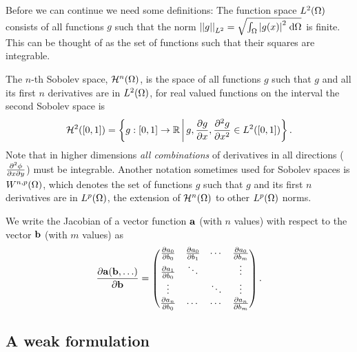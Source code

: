 Before we can continue we need some definitions:
The function space $L^{2}(\Omega)$ consists of all functions $g$ such that the norm $\left| \left| g \right| \right|_{L^2} = \sqrt{{\int_{\Omega} {\left|{g(x)} \right|^{2}} {\; \mathrm{{d}}} {\Omega}}}$ is finite.
This can be thought of as the set of functions such that their squares are integrable.

The $n$-th Sobolev space, $\mathcal{H}^n(\Omega)$, is the space of all functions $g$ such that $g$ and all its first $n$ derivatives are in $L^2(\Omega)$, \eg for real valued functions on the interval the second Sobolev space is
\begin{equation}
  \label{eq:H1}
  \mathcal{H}^2([0,1]) = \left\{ { g : [0,1] \rightarrow \mathbb{R} } \,\middle|\, { g, \frac{\partial g}{\partial x}, \frac{\partial ^2g}{\partial x^2} \in L^2([0,1])} \right\}.
\end{equation}
Note that in higher dimensions \emph{all combinations} of derivatives in all directions (\eg $\frac{\partial ^2\phi}{\partial x\partial y}$) must be integrable.
Another notation sometimes used for Sobolev spaces is $W^{n,p}(\Omega)$, which denotes the set of functions $g$ such that $g$ and its first $n$ derivatives are in $L^p(\Omega)$, \ie the extension of $\mathcal{H}^n(\Omega)$ to other $L^p(\Omega)$ norms.

We write the Jacobian of a vector function ${\boldsymbol{\mathrm{a}}}$ (with $n$ values) with respect to the vector ${\boldsymbol{\mathrm{b}}}$ (with $m$ values) as
\begin{equation}
  \frac{\partial {\boldsymbol{\mathrm{a}}}({\boldsymbol{\mathrm{b}}}, \ldots)}{\partial {\boldsymbol{\mathrm{b}}}} = \begin{pmatrix}
    \frac{\partial a_0}{\partial b_0} & \frac{\partial a_0}{\partial b_1} & \cdots & \frac{\partial a_0}{\partial b_m} \\
    \frac{\partial a_1}{\partial b_0} & \ddots & & \vdots \\
    \vdots &  & \ddots & \vdots \\
    \frac{\partial a_n}{\partial b_0} & \cdots & \cdots & \frac{\partial a_n}{\partial b_m}
  \end{pmatrix}.
  \label{eq:jac-def}
\end{equation}


\subsection{A weak formulation}
\label{Derivation-of-weighted-residuals}

